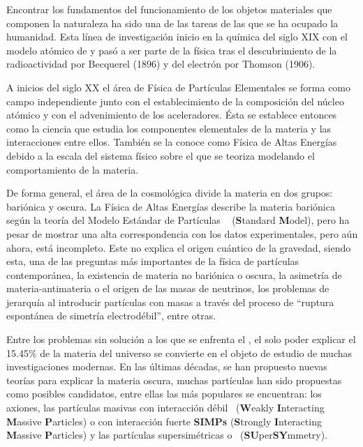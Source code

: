 Encontrar los fundamentos del funcionamiento de los objetos materiales que componen la naturaleza ha sido una de las tareas de las que se ha ocupado la humanidad. Esta línea de investigación inicio en la química del siglo XIX con el modelo atómico de \citet{dalton} y pasó a ser parte de la física tras el descubrimiento de la radioactividad por %
Becquerel (1896) y del electrón por Thomson (1906).

A inicios del siglo XX el área de Física de Partículas Elementales se forma como campo independiente junto con el establecimiento de la composición del núcleo atómico y con el advenimiento de los aceleradores. Ésta se establece entonces como la ciencia que estudia los componentes elementales de la materia y las interacciones entre ellos. También se la conoce como Física de Altas Energías debido a la escala del sistema físico sobre el que se teoriza modelando el comportamiento de la materia.

De forma general, el área de la cosmológica divide la materia en dos grupos: bariónica y oscura. La Física de Altas Energías describe la materia bariónica según la teoría del Modelo Estándar de Partículas \ME ~ (\textbf{S}tandard \textbf{M}odel), pero ha pesar de mostrar una alta correspondencia con los datos experimentales, pero aún ahora, está incompleto. Este no explica el origen cuántico de la gravedad, siendo esta, una de las preguntas más importantes de la física de partículas contemporánea, la existencia de materia no bariónica o oscura, la asimetría de materia-antimateria o el origen de las masas de neutrinos, los problemas de jerarquía al introducir partículas con masas a través del proceso de ``ruptura espontánea de simetría electrodébil'', entre otras. 


Entre los problemas sin solución a los que se enfrenta el \ME, el solo poder explicar el 15.45\% de la materia del universo se convierte en el objeto de estudio de muchas investigaciones modernas. En las últimas décadas, se han propuesto nuevas teorías para explicar la materia oscura, muchas partículas han sido propuestas como posibles candidatos, entre ellas las más populares se encuentran: los axiones, las partículas masivas con interacción  débil \WIMPs ~(\textbf{W}eakly \textbf{I}nteracting \textbf{M}assive \textbf{P}articles) o con interacción fuerte \textbf{SIMPs} (\textbf{S}trongly \textbf{I}nteracting \textbf{M}assive \textbf{P}articles) y las partículas supersimétricas o \SUSY~(\textbf{SU}per\textbf{SY}mmetry).%

